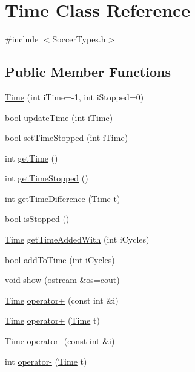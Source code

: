 \hypertarget{classTime}{}\section{Time Class Reference}
\label{classTime}


{\ttfamily \#include $<$Soccer\+Types.\+h$>$}

\subsection*{Public Member Functions}
\begin{DoxyCompactItemize}
\item 
\hyperlink{classTime_a9f5462d0b137149663ecab92fce1c6ba}{Time} (int i\+Time=-\/1, int i\+Stopped=0)
\item 
bool \hyperlink{classTime_a03f1b6cddf5a74561f4f618739aa950b}{update\+Time} (int i\+Time)
\item 
bool \hyperlink{classTime_ac0bc9c2ad2d557cb4d1fbcf4c7288fee}{set\+Time\+Stopped} (int i\+Time)
\item 
int \hyperlink{classTime_af152c078155bff82fc1a0bf402e7a5c6}{get\+Time} ()
\item 
int \hyperlink{classTime_acd8d8ee124ad3da3fce0b871f77e03b1}{get\+Time\+Stopped} ()
\item 
int \hyperlink{classTime_a2cbf2b5afab7e0adb9f4d0705f8ddf19}{get\+Time\+Difference} (\hyperlink{classTime}{Time} t)
\item 
bool \hyperlink{classTime_acb3478d2f80c96df5b02874d3641f311}{is\+Stopped} ()
\item 
\hyperlink{classTime}{Time} \hyperlink{classTime_a21903ca39895293f7aaacd8eb064069b}{get\+Time\+Added\+With} (int i\+Cycles)
\item 
bool \hyperlink{classTime_ac4e67c4ab9e3a7130c513801901f8447}{add\+To\+Time} (int i\+Cycles)
\item 
void \hyperlink{classTime_a74fa773c613ffd28a1e00d7d1e98e444}{show} (ostream \&os=cout)
\item 
\hyperlink{classTime}{Time} \hyperlink{classTime_a0dadef49967e1e942b5628dec462fcff}{operator+} (const int \&i)
\item 
\hyperlink{classTime}{Time} \hyperlink{classTime_a0b1018cc786f04121e9571f67b636fa0}{operator+} (\hyperlink{classTime}{Time} t)
\item 
\hyperlink{classTime}{Time} \hyperlink{classTime_a6c66dbf03f8e28edbf23e26bd32fb04e}{operator-\/} (const int \&i)
\item 
int \hyperlink{classTime_ad012e8fd674cda9eaf0f731478cbc35a}{operator-\/} (\hyperlink{classTime}{Time} t)

\end{DoxyCompactItemize}
